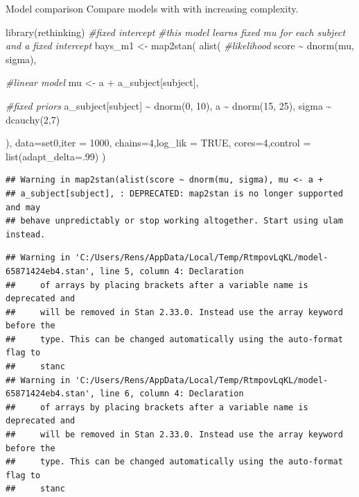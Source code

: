 \documentclass[
  ignorenonframetext,
]{beamer}
\newenvironment{Shaded}{\begin{snugshade}}{\end{snugshade}}
\newcommand{\AttributeTok}[1]{\textcolor[rgb]{0.77,0.63,0.00}{#1}}
\newcommand{\CommentTok}[1]{\textcolor[rgb]{0.56,0.35,0.01}{\textit{#1}}}
\newcommand{\ConstantTok}[1]{\textcolor[rgb]{0.00,0.00,0.00}{#1}}
\newcommand{\DecValTok}[1]{\textcolor[rgb]{0.00,0.00,0.81}{#1}}
\newcommand{\FunctionTok}[1]{\textcolor[rgb]{0.00,0.00,0.00}{#1}}
\newcommand{\NormalTok}[1]{#1}
\newcommand{\OtherTok}[1]{\textcolor[rgb]{0.56,0.35,0.01}{#1}}
\newcommand{\SpecialCharTok}[1]{\textcolor[rgb]{0.00,0.00,0.00}{#1}}
\begin{document}
\begin{frame}[fragile]{Model comparison}
\protect\hypertarget{model-comparison-2}{}
Compare models with with increasing complexity.

\begin{Shaded}
\begin{Highlighting}[]
\FunctionTok{library}\NormalTok{(rethinking)}
\CommentTok{\#fixed intercept}
\CommentTok{\#this model learns fixed mu for each subject and a fixed intercept}
\NormalTok{bays\_m1 }\OtherTok{\textless{}{-}} \FunctionTok{map2stan}\NormalTok{(}
  \FunctionTok{alist}\NormalTok{(}
    \CommentTok{\#likelihood}
\NormalTok{    score }\SpecialCharTok{\textasciitilde{}} \FunctionTok{dnorm}\NormalTok{(mu, sigma),}
    
    \CommentTok{\#linear model}
\NormalTok{    mu }\OtherTok{\textless{}{-}}\NormalTok{ a }\SpecialCharTok{+}\NormalTok{ a\_subject[subject],}
    
    \CommentTok{\#fixed priors}
\NormalTok{    a\_subject[subject] }\SpecialCharTok{\textasciitilde{}} \FunctionTok{dnorm}\NormalTok{(}\DecValTok{0}\NormalTok{, }\DecValTok{10}\NormalTok{),}
\NormalTok{    a }\SpecialCharTok{\textasciitilde{}} \FunctionTok{dnorm}\NormalTok{(}\DecValTok{15}\NormalTok{, }\DecValTok{25}\NormalTok{),}
\NormalTok{    sigma }\SpecialCharTok{\textasciitilde{}} \FunctionTok{dcauchy}\NormalTok{(}\DecValTok{2}\NormalTok{,}\DecValTok{7}\NormalTok{)}

\NormalTok{  ),}
  \AttributeTok{data=}\NormalTok{set0,}\AttributeTok{iter =} \DecValTok{1000}\NormalTok{,}
  \AttributeTok{chains=}\DecValTok{4}\NormalTok{,}\AttributeTok{log\_lik =} \ConstantTok{TRUE}\NormalTok{,}
  \AttributeTok{cores=}\DecValTok{4}\NormalTok{,}\AttributeTok{control =} \FunctionTok{list}\NormalTok{(}\AttributeTok{adapt\_delta=}\NormalTok{.}\DecValTok{99}\NormalTok{)}
\NormalTok{)}
\end{Highlighting}
\end{Shaded}

\begin{verbatim}
## Warning in map2stan(alist(score ~ dnorm(mu, sigma), mu <- a +
## a_subject[subject], : DEPRECATED: map2stan is no longer supported and may
## behave unpredictably or stop working altogether. Start using ulam instead.
\end{verbatim}

\begin{verbatim}
## Warning in 'C:/Users/Rens/AppData/Local/Temp/RtmpovLqKL/model-65871424eb4.stan', line 5, column 4: Declaration
##     of arrays by placing brackets after a variable name is deprecated and
##     will be removed in Stan 2.33.0. Instead use the array keyword before the
##     type. This can be changed automatically using the auto-format flag to
##     stanc
## Warning in 'C:/Users/Rens/AppData/Local/Temp/RtmpovLqKL/model-65871424eb4.stan', line 6, column 4: Declaration
##     of arrays by placing brackets after a variable name is deprecated and
##     will be removed in Stan 2.33.0. Instead use the array keyword before the
##     type. This can be changed automatically using the auto-format flag to
##     stanc
\end{verbatim}


\end{frame}
\end{document}
